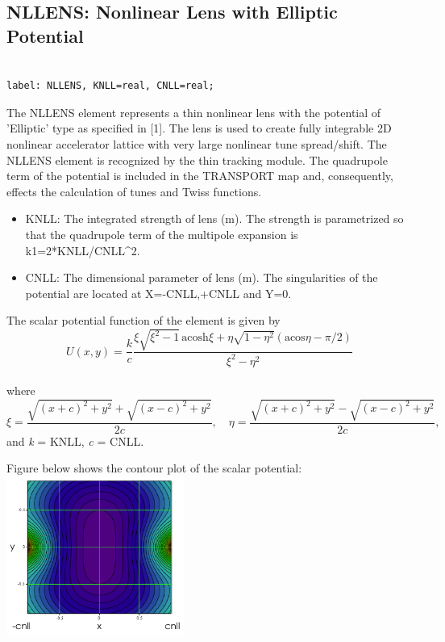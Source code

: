 


\subsection{NLLENS: Nonlinear Lens with Elliptic Potential}
\begin{verbatim}

label: NLLENS, KNLL=real, CNLL=real;
\end{verbatim}      The NLLENS element represents a thin nonlinear lens with the potential of 'Elliptic' type as specified in [1]. The lens is used to create fully integrable 2D nonlinear accelerator lattice with very large nonlinear tune spread/shift. The NLLENS element is recognized by the thin tracking module. The quadrupole term of the potential is included in the TRANSPORT map and, consequently, effects the calculation of tunes and Twiss functions.  
\begin{itemize}
	\item KNLL: The integrated strength of lens (m). The strength is parametrized so that     the quadrupole term of the multipole expansion is k1=2*KNLL/CNLL\textasciicircum2.     
	\item CNLL: The dimensional parameter of lens (m). The singularities of the potential are     located at X=-CNLL,+CNLL and Y=0. 
\end{itemize}

The scalar potential function of the element is given by
\\
\[
U(x,y)=\frac{k}{c}\frac{\xi\sqrt{\xi^2-1} \, \text{acosh}\xi + \eta\sqrt{1-\eta^2}(\text{acos}\eta-\pi/2)}{\xi^2-\eta^2}
\]
\\ where 
\[
\xi = \frac{\sqrt{(x+c)^2+y^2}+\sqrt{(x-c)^2+y^2}}{2c}, \quad \eta = \frac{\sqrt{(x+c)^2+y^2}-\sqrt{(x-c)^2+y^2}}{2c},
\]
and \textit{k} = KNLL, \textit{c} = CNLL.

Figure below shows the contour plot of the scalar potential:
\\
\includegraphics[width=220px]{Introduction/nllens_potential-2D.png}

